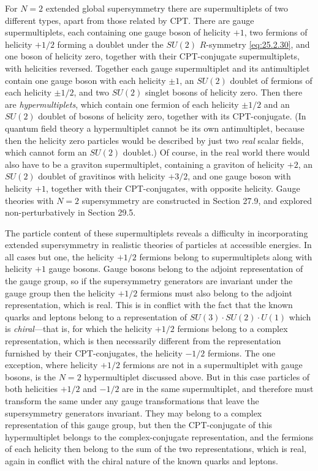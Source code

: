 For $N=2$ extended global supersymmetry there are supermultiplets of two
different types, apart from those related by CPT. There are gauge
supermultiplets, each containing one gauge boson of helicity $+1$, two
fermions of helicity $+1/2$ forming a doublet under the $SU(2)$ $R$-symmetry
\eqref{eq:25.2.30}, and one boson of helicity zero, together with their
CPT-conjugate supermultiplets, with helicities reversed. Together each gauge
supermultiplet and its antimultiplet contain one gauge boson with each helicity
$\pm1$, an $SU(2)$ doublet of fermions of each helicity $\pm1/2$, and two
$SU(2)$ singlet bosons of helicity zero. Then there are
\emph{hypermultiplets}, which contain one fermion of each helicity $\pm1/2$
and an $SU(2)$ doublet of bosons of helicity zero, together with its
CPT-conjugate. (In quantum field theory a hypermultiplet cannot be its own
antimultiplet, because then the helicity zero particles would be described by
just two \emph{real} scalar fields, which cannot form an $SU(2)$ doublet.) Of
course, in the real world there would also have to be a graviton
supermultiplet, containing a graviton of helicity $+2$, an $SU(2)$ doublet of
gravitinos with helicity $+3/2$, and one gauge boson with helicity $+1$,
together with their CPT-conjugates, with opposite helicity. Gauge theories
with $N=2$ supersymmetry are constructed in Section 27.9, and explored
non-perturbatively in Section 29.5.

The particle content of these supermultiplets reveals a difficulty in
incorporating extended supersymmetry in realistic theories of particles at
accessible energies. In all cases but one, the helicity $+1/2$ fermions belong
to supermultiplets along with helicity $+1$ gauge bosons. Gauge bosons belong
to the adjoint representation of the gauge group, so if the supersymmetry
generators are invariant under the gauge group then the helicity $+1/2$
fermions must also belong to the adjoint representation, which is real. This
is in conflict with the fact that the known quarks and leptons belong to a
representation of $SU(3)\cdot SU(2)\cdot U(1)$ which is \emph{chiral}---that
is, for which the helicity $+1/2$ fermions belong to a complex representation,
which is then necessarily different from the representation furnished by
their CPT-conjugates, the helicity $-1/2$ fermions. The one exception, where
helicity $+1/2$ fermions are not in a supermultiplet with gauge bosons, is the
$N=2$ hypermultiplet discussed above. But in this case particles of both
helicities $+1/2$ and $-1/2$ are in the same supermultiplet, and therefore must
transform the same under any gauge transformations that leave the
supersymmetry generators invariant. They may belong to a complex
representation of this gauge group, but then the CPT-conjugate of this
hypermultiplet belongs to the complex-conjugate representation, and the
fermions of each helicity then belong to the sum of the two representations,
which is real, again in conflict with the chiral nature of the known quarks
and leptons.

